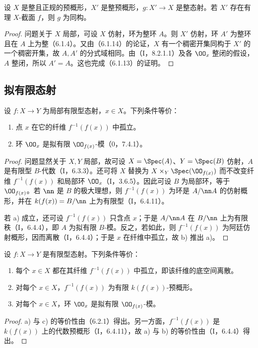 设 $X$ 是整且正规的预概形，$X'$ 是整预概形，$g:X'\to X$ 是整态射。若 $X'$ 存在有理 $X$-截面 $f$，则 $g$ 为同构。
\begin{proof}
问题关于 $X$ 局部，可设 $X$ 仿射，环为整环 $A$。则 $X'$ 仿射，环 $A'$ 为整环且在 $A$ 上为整（6.1.4）。又由（6.1.14）的论证，$X$ 有一个稠密开集同构于 $X'$ 的一个稠密开集，故 $A,A'$ 的分式域相同。由（I，8.2.1.1）及各 $\OO_x$ 整闭的假设，$A$ 整闭，所以 $A'=A$。这也完成（6.1.13）的证明。
\end{proof}

\subsection{拟有限态射}

设 $f:X\to Y$ 为局部有限型态射，$x\in X$。下列条件等价：
\begin{enumerate}[label=\alph*)]
\item 点 $x$ 在它的纤维 $f^{-1}(f(x))$ 中孤立。
\item 环 $\OO_x$ 是拟有限 $\OO_{f(x)}$-模（0，7.4.1）。
\end{enumerate}
\begin{proof}
问题显然关于 $X,Y$ 局部，故可设 $X=\Spec(A)$、$Y=\Spec(B)$ 仿射，$A$ 是有限型 $B$-代数（I，6.3.3）。还可将 $X$ 替换为
$X\times_Y\Spec(\OO_{f(x)})$ 而不改变纤维 $f^{-1}(f(x))$ 和局部环 $\OO_x$（I，3.6.5）。因此可设 $B$ 为局部环，等于 $\OO_{f(x)}$。若 $\nn$ 是 $B$ 的极大理想，则 $f^{-1}(f(x))$ 为环是 $A/\nn A$ 的仿射概形，并在 $k(f(x))=B/\nn$ 上为有限型（I，6.4.11）。

若 a) 成立，还可设 $f^{-1}(f(x))$ 只含点 $x$；于是 $A/\nn A$ 在 $B/\nn$ 上为有限秩（I，6.4.4），即 $A$ 为拟有限 $B$-模。反之，若如此，则 $f^{-1}(f(x))$ 为阿廷仿射概形，因而离散（I，6.4.4）；于是 $x$ 在纤维中孤立，故 b) 推出 a)。
\end{proof}

设 $f:X\to Y$ 是有限型态射。下列条件等价：
\begin{enumerate}[label=\alph*)]
\item 每个 $x\in X$ 都在其纤维 $f^{-1}(f(x))$ 中孤立，即该纤维的底空间离散。
\item 对每个 $x\in X$，$f^{-1}(f(x))$ 为有限 $k(f(x))$-预概形。
\item 对每个 $x\in X$，环 $\OO_x$ 是拟有限 $\OO_{f(x)}$-模。
\end{enumerate}
\begin{proof}
a) 与 c) 的等价性由（6.2.1）得出。另一方面，$f^{-1}(f(x))$ 是 $k(f(x))$ 上的代数预概形（I，6.4.11），故 a) 与 b) 的等价性由（I，6.4.4）得出。
\end{proof}

